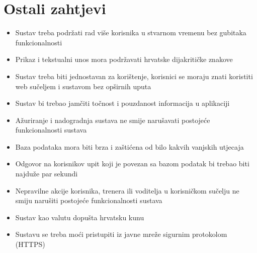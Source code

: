 				
				
				\eject
	            
	            
	            
		\section{Ostali zahtjevi}
		
			\begin{itemize}
	        	\item 	Sustav treba podržati rad više korisnika u stvarnom vremenu bez gubitaka funkcionalnosti
	        	\item 	Prikaz i tekstualni unos mora podržavati hrvatske dijakritičke znakove
	        	\item 	Sustav treba biti jednostavan za korištenje, korisnici se moraju znati koristiti web sučeljem i sustavom bez opširnih uputa 
	        	\item 	Sustav bi trebao jamčiti točnost i pouzdanost informacija u aplikaciji
	        	\item 	Ažuriranje i nadogradnja sustava ne smije narušavati postojeće funkcionalnosti sustava
	        	\item 	Baza podataka mora biti brza i zaštićena od bilo kakvih vanjskih utjecaja
	        	\item 	Odgovor na korisnikov upit koji je povezan sa bazom podatak bi trebao biti najduže par sekundi
	        	\item 	Nepravilne akcije korisnika, trenera ili voditelja u korisničkom sučelju ne smiju narušiti postojeće funkcionalnosti sustava
	        	\item 	Sustav kao valutu dopušta hrvatsku kunu
	        	\item 	Sustavu se treba moći pristupiti iz javne mreže sigurnim protokolom (HTTPS)
        	\end{itemize}
			 
			 
			 
	